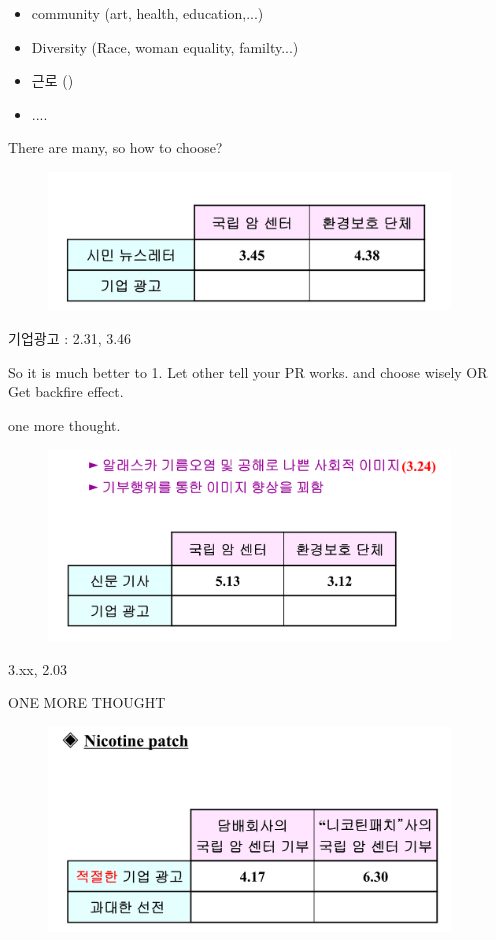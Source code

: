 \documentclass[12pt]{article}
\begin{document}
\begin{itemize}
\begin{itemize}
	\item community (art, health, education,...)
	\item Diversity (Race, woman equality, familty...)
	\item 근로 ()
	\item
	....
\end{itemize}

 There are many, so how to choose?

\begin{figure}[H]
	\centering
	\includegraphics[width=0.95\textwidth]{img/tabacoo.png}
	\caption{}
	\label{}
\end{figure}

 기업광고 : 2.31, 3.46

So it is much better to 1. Let other tell your PR works. and choose wisely OR Get backfire effect.

one more thought.


\begin{figure}[H]
	\centering
	\includegraphics[width=0.95\textwidth]{img/ecofr.png}
	\caption{}
	\label{}
\end{figure}

3.xx, 2.03


ONE MORE THOUGHT
\begin{figure}[H]
	\centering
	\includegraphics[width=0.95\textwidth]{img/nico.png}
	\caption{}
	\label{}
\end{figure}


\end{itemize}
\end{document}
